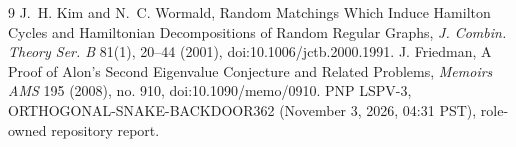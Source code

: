 \documentclass[11pt]{article}
\begin{document}
\begin{thebibliography}{9}
 J.~H. Kim and N.~C. Wormald, Random Matchings Which Induce Hamilton Cycles and Hamiltonian Decompositions of Random Regular Graphs, \emph{J. Combin. Theory Ser. B} 81(1), 20--44 (2001), doi:10.1006/jctb.2000.1991.
 J. Friedman, A Proof of Alon's Second Eigenvalue Conjecture and Related Problems, \emph{Memoirs AMS} 195 (2008), no. 910, doi:10.1090/memo/0910.
 PNP LSPV-3, ORTHOGONAL-SNAKE-BACKDOOR362 (November 3, 2026, 04:31 PST), role-owned repository report.
\end{thebibliography}
\end{document}
